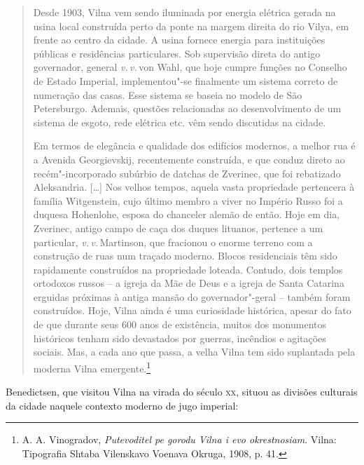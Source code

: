 \begin{quote}
Desde 1903, Vilna vem sendo iluminada por energia elétrica gerada na
usina local construída perto da ponte na margem direita do
rio Vilya, em frente ao centro da cidade. A usina fornece energia para
instituições públicas e residências particulares. Sob supervisão direta
do antigo governador, general \textit{v.\,v.}\,von Wahl, que hoje cumpre funções no
Conselho de Estado Imperial, implementou"-se finalmente um sistema
correto de numeração das casas. Esse sistema se baseia no modelo de São
Petersburgo. Ademais, questões relacionadas ao desenvolvimento de um
sistema de esgoto, rede elétrica etc. vêm sendo discutidas na cidade.

Em termos de elegância e qualidade dos edifícios modernos, a melhor rua
é a Avenida Georgievskij, recentemente construída, e que conduz direto
ao recém"-incorporado subúrbio de datchas de Zverinec, que foi rebatizado
Aleksandria. [\ldots{}] Nos velhos tempos, aquela vasta propriedade
pertencera à família Witgenstein, cujo último membro a viver no Império
Russo foi a duquesa Hohenlohe, esposa do chanceler alemão de então. Hoje
em dia, Zverinec, antigo campo de caça dos duques lituanos,
pertence a um particular, \textit{v.\,v.}\,Martinson, que fracionou o enorme
terreno com a construção de ruas num traçado moderno. Blocos
residenciais têm sido rapidamente construídos na propriedade loteada.
Contudo, dois templos ortodoxos russos -- a igreja da Mãe de Deus e a
igreja de Santa Catarina erguidas próximas à antiga mansão do
governador"-geral -- também foram construídos. Hoje, Vilna ainda é uma
curiosidade histórica, apesar do fato de que durante seus 600 anos de
existência, muitos dos monumentos históricos tenham sido devastados por
guerras, incêndios e agitações sociais. Mas, a cada ano que passa, a
velha Vilna tem sido suplantada pela moderna Vilna emergente.\footnote{A. A. Vinogradov, \textit{Putevoditel pe gorodu Vilna i evo okrestnosiam}. Vilna: Tipografia Shtaba Vilenskavo Voenava Okruga, 1908, p. 41.} 
\end{quote}

Benedictsen, que visitou Vilna na virada do século \textsc{xx}, situou as
divisões culturais da cidade naquele contexto moderno de jugo imperial:

